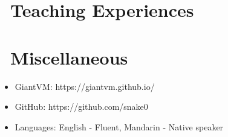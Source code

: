 \documentclass{resume}
\begin{document}
\section{\faUsers\ Teaching Experiences}

\section{\faInfo\ Miscellaneous}
\begin{itemize}[parsep=0.5ex]
  \item GiantVM: https://giantvm.github.io/
  \item GitHub: https://github.com/snake0
  \item Languages: English - Fluent, Mandarin - Native speaker
\end{itemize}

%
%
\end{document}
